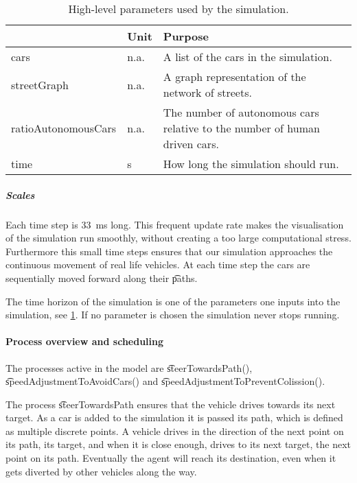	\begin{table}
		\centering
		\begin{tabularx}{\textwidth}{>{\ttfamily}llX}
			\toprule
			\normalfont{Parameter}	&Unit & Purpose \\ 
			\midrule
			cars 					
				& n.a.
				& A list of the cars in the simulation. \\ 
			streetGraph		 		
				& n.a.
				& A graph representation of the network of streets. \\ 
			ratioAutonomousCars		 		
				& n.a.
				& The number of autonomous cars relative to the number of human driven cars.\\
			time 
				& \si{\second}
				& How long the simulation should run.\\ 
			\bottomrule
		\end{tabularx}
		\caption{High-level parameters used by the simulation.}
		\label{tab:par:method:model:overview:state:highlevel:sim}
	\end{table}

	\subparagraph{Scales}
	Each time step is \si{33 \milli\second} long. This frequent update rate makes the visualisation of the simulation run smoothly, without creating a too large computational stress. Furthermore this small time steps ensures that our simulation approaches the continuous movement of real life vehicles. 
	At each time step the cars are sequentially moved forward along their \t{paths}. 

	The time horizon of the simulation is one of the parameters one inputs into the simulation, see \cref{tab:par:method:model:overview:state:highlevel:sim}. If no parameter is chosen the simulation never stops running. 


\paragraph{Process overview and scheduling}
\label{par:method:model:overview:process}
The processes active in the model are \t{steerTowardsPath()}, \t{speedAdjustmentToAvoidCars()} and \t{speedAdjustmentToPreventColission()}. 

The process \t{steerTowardsPath} ensures that the vehicle drives towards its next target. As a car is added to the simulation it is passed its path, which is defined as multiple discrete points. A vehicle drives in the direction of the next point on its path, its target, and when it is close enough, drives to its next target, the next point on its path. Eventually the agent will reach its destination, even when it gets diverted by other vehicles along the way.

